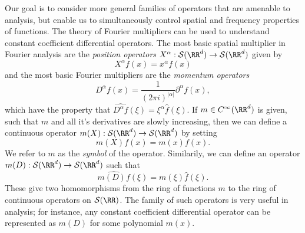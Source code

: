 Our goal is to consider more general families of operators that are amenable to analysis, but enable us to simultaneously control spatial and frequency properties of functions. The theory of Fourier multipliers can be used to understand constant coefficient differential operators. The most basic spatial multiplier in Fourier analysis are the \emph{position operators} $X^\alpha: \mathcal{S}(\RR^d) \to \mathcal{S}(\RR^d)$ given by
%
\[ X^\alpha f(x) = x^\alpha f(x) \]
%
and the most basic Fourier multipliers are the \emph{momentum operators}
%
\[ D^\alpha f(x) = \frac{1}{(2\pi i)^{|\alpha|}} \partial^\alpha f(x), \]
%
which have the property that $\widehat{D^\alpha f}(\xi) = \xi^\alpha \widehat{f}(\xi)$. If $m \in C^\infty(\RR^d)$ is given, such that $m$ and all it's derivatives are slowly increasing, then we can define a continuous operator $m(X): \mathcal{S}(\RR^d) \to \mathcal{S}(\RR^d)$ by setting
%
\[ m(X) f(x) = m(x) f(x). \]
%
We refer to $m$ as the \emph{symbol} of the operator. Similarily, we can define an operator $m(D): \mathcal{S}(\RR^d) \to \mathcal{S}(\RR^d)$ such that
%
\[ \widehat{m(D) f}(\xi) = m(\xi) \widehat{f}(\xi). \]
%
These give two homomorphisms from the ring of functions $m$ to the ring of continuous operators on $\mathcal{S}(\RR)$. The family of such operators is very useful in analysis; for instance, any constant coefficient differential operator can be represented as $m(D)$ for some polynomial $m(x)$.

